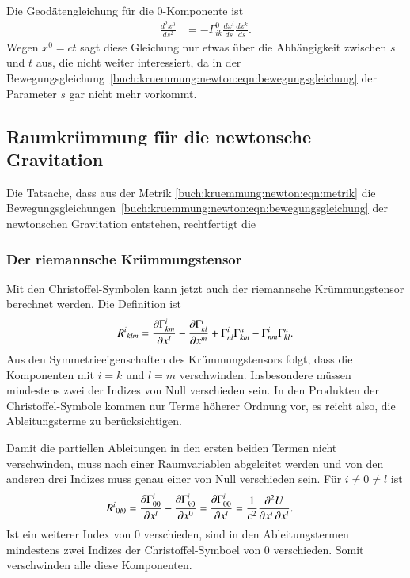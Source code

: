 Die Geodätengleichung für die $0$-Komponente ist
\begin{align*}
\frac{d^2x^0}{ds^2}
&=
-
\Gamma^0_{ik}
\frac{dx^i}{ds}
\frac{dx^k}{ds}.
\end{align*}
Wegen $x^0=ct$ sagt diese Gleichung nur etwas über die Abhängigkeit 
zwischen $s$ und $t$ aus, die nicht weiter interessiert,
da in der
Bewegungsgleichung~\eqref{buch:kruemmung:newton:eqn:bewegungsgleichung}
der Parameter $s$ gar nicht mehr vorkommt.

%
%
\subsection{Raumkrümmung für die newtonsche Gravitation}
Die Tatsache, dass aus der Metrik
\eqref{buch:kruemmung:newton:eqn:metrik}
die
Bewegungsgleichungen~\eqref{buch:kruemmung:newton:eqn:bewegungsgleichung}
der newtonschen Gravitation entstehen, rechtfertigt die 

\subsubsection{Der riemannsche Krümmungstensor}
Mit den Christoffel-Symbolen kann jetzt auch der riemannsche Krümmungstensor
berechnet werden.
Die Definition ist
\begin{equation}
R^{i}\mathstrut_{klm}
=
\frac{\partial \Gamma^i_{km}}{\partial x^l}
-
\frac{\partial \Gamma^i_{kl}}{\partial x^m}
+
\Gamma^i_{nl}
\Gamma^n_{km}
-
\Gamma^i_{nm}
\Gamma^n_{kl}.
\end{equation}
Aus den Symmetrieeigenschaften des Krümmungstensors folgt, dass die
Komponenten mit $i=k$ und $l=m$ verschwinden.
Insbesondere müssen mindestens zwei der Indizes von Null verschieden sein.
In den Produkten der Christoffel-Symbole kommen nur Terme höherer Ordnung
vor, es reicht also, die Ableitungsterme zu berücksichtigen.

Damit die partiellen Ableitungen in den ersten beiden Termen nicht
verschwinden, muss nach einer Raumvariablen abgeleitet werden und von
den anderen drei Indizes muss genau einer von Null verschieden sein.
Für $i\ne 0\ne l$ ist
\begin{align}
R^i\mathstrut_{0l0}
&=
\frac{\partial \Gamma^i_{00}}{\partial x^l}
-
\frac{\partial \Gamma^i_{k0}}{\partial x^0}
=
\frac{\partial \Gamma^i_{00}}{\partial x^l}
=
\frac{1}{c^2}
\frac{\partial^2 U}{\partial x^i\,\partial x^l}.
\label{buch:kruemmung:newton:eqn:riemann}
\end{align}
Ist ein weiterer Index von 0 verschieden, sind in den Ableitungstermen
mindestens zwei Indizes der Christoffel-Symboel von 0 verschieden.
Somit verschwinden alle diese Komponenten.

